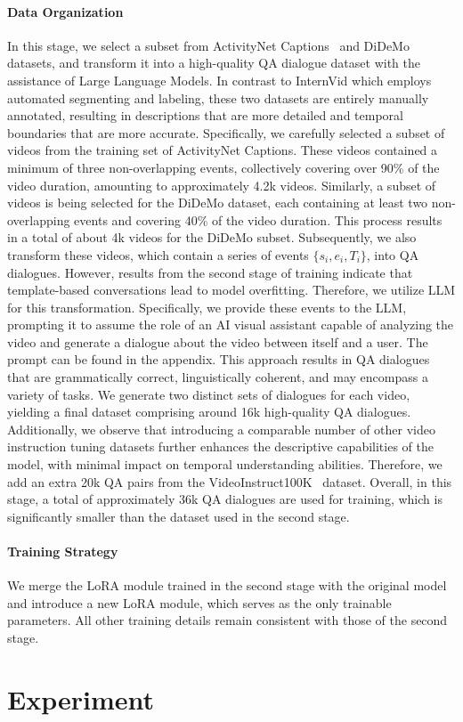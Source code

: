 \documentclass[10pt,twocolumn,letterpaper]{article}
\begin{document}
\paragraph{Data Organization} In this stage, we select a subset from ActivityNet Captions~\cite{krishna2017dense_dense45} and DiDeMo~\cite{anne2017localizing_grounding10} datasets, and transform it into a high-quality QA dialogue dataset with the assistance of Large Language Models. In contrast to InternVid which employs automated segmenting and labeling, these two datasets are entirely manually annotated, resulting in descriptions that are more detailed and temporal boundaries that are more accurate. Specifically, we carefully selected a subset of videos from the training set of ActivityNet Captions. These videos contained a minimum of three non-overlapping events, collectively covering over 90\% of the video duration, amounting to approximately 4.2k videos. Similarly, a subset of videos is being selected for the DiDeMo dataset, each containing at least two non-overlapping events and covering 40\% of the video duration. This process results in a total of about 4k videos for the DiDeMo subset. Subsequently, we also transform these videos, which contain a series of events $\{s_i, e_i, T_i\}$, into QA dialogues. However, results from the second stage of training indicate that template-based conversations lead to model overfitting. Therefore, we utilize LLM for this transformation. Specifically, we provide these events to the LLM, prompting it to assume the role of an AI visual assistant capable of analyzing the video and generate a dialogue about the video between itself and a user. The prompt can be found in the appendix. This approach results in QA dialogues that are grammatically correct, linguistically coherent, and may encompass a variety of tasks. We generate two distinct sets of dialogues for each video, yielding a final dataset comprising around 16k high-quality QA dialogues. Additionally, we observe that introducing a comparable number of other video instruction tuning datasets further enhances the descriptive capabilities of the model, with minimal impact on temporal understanding abilities. Therefore, we add an extra 20k QA pairs from the VideoInstruct100K~\cite{maaz2023videochatgpt} dataset. Overall, in this stage, a total of approximately 36k QA dialogues are used for training, which is significantly smaller than the dataset used in the second stage.

\paragraph{Training Strategy} We merge the LoRA module trained in the second stage with the original model and introduce a new LoRA module, which serves as the only trainable parameters. All other training details remain consistent with those of the second stage. \section{Experiment}
\end{document}
